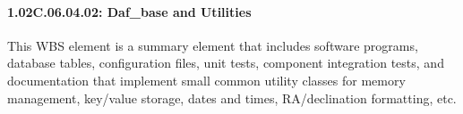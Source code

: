 \paragraph{1.02C.06.04.02: Daf\_base and Utilities}

This WBS element is a summary element that includes software programs, database tables, configuration files, unit tests, component integration tests, and documentation that implement small common utility classes for memory management, key/value storage, dates and times, RA/declination formatting, etc.
